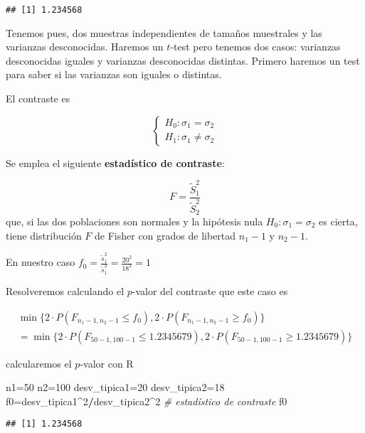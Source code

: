 \documentclass[
]{article}
\newenvironment{Shaded}{\begin{snugshade}}{\end{snugshade}}
\newcommand{\CommentTok}[1]{\textcolor[rgb]{0.56,0.35,0.01}{\textit{#1}}}
\newcommand{\DecValTok}[1]{\textcolor[rgb]{0.00,0.00,0.81}{#1}}
\newcommand{\NormalTok}[1]{#1}
\newcommand{\OperatorTok}[1]{\textcolor[rgb]{0.81,0.36,0.00}{\textbf{#1}}}
\begin{document}
\begin{verbatim}
## [1] 1.234568
\end{verbatim}

Tenemos pues, dos muestras independientes de tamaños muestrales y las
varianzas desconocidas. Haremos un \(t\)-test pero tenemos dos casos:
varianzas desconocidas iguales y varianzas desconocidas distintas.
Primero haremos un test para saber si las varianzas son iguales o
distintas.

El contraste es

\[
\left\{
\begin{array}{ll}
H_{0}:\sigma_1=\sigma_2\\
H_{1}:\sigma_1\not= \sigma_2 
\end{array}
\right.
\]

Se emplea el siguiente \textbf{estadístico de contraste}:

\[
F=\frac{\widetilde{S}_1^2}{\widetilde{S}_2^2}
\] que, si las dos poblaciones son normales y la hipótesis nula
\(H_0:\sigma_1=\sigma_2\) es cierta, tiene distribución \(F\) de Fisher
con grados de libertad \(n_1-1\) y \(n_2-1\).

En nuestro caso
\(f_0=\frac{\tilde{s}_1^2}{\tilde{s}_1^2}= \frac{20^2}{18^2}=1\)

Resolveremos calculando el \(p\)-valor del contraste que este caso es

\[
\begin{array}{l}
\min\{2\cdot P(F_{n_1-1,n_2-1}\leq f_0),2\cdot P(F_{n_1-1,n_2-1}\geq f_0)\}\\=\min\{2\cdot P(F_{50-1,100-1}\leq 1.2345679),2\cdot P(F_{50-1,100-1}\geq 1.2345679)\}
\end{array}
\]

calcularemos el \(p\)-valor con R

\begin{Shaded}
\begin{Highlighting}[]
\NormalTok{n1=}\DecValTok{50}
\NormalTok{n2=}\DecValTok{100}
\NormalTok{desv_tipica1=}\DecValTok{20}
\NormalTok{desv_tipica2=}\DecValTok{18}
\NormalTok{f0=desv_tipica1}\OperatorTok{^}\DecValTok{2}\OperatorTok{/}\NormalTok{desv_tipica2}\OperatorTok{^}\DecValTok{2} \CommentTok{# estadístico de contraste}
\NormalTok{f0}
\end{Highlighting}
\end{Shaded}

\begin{verbatim}
## [1] 1.234568
\end{verbatim}
\end{document}
